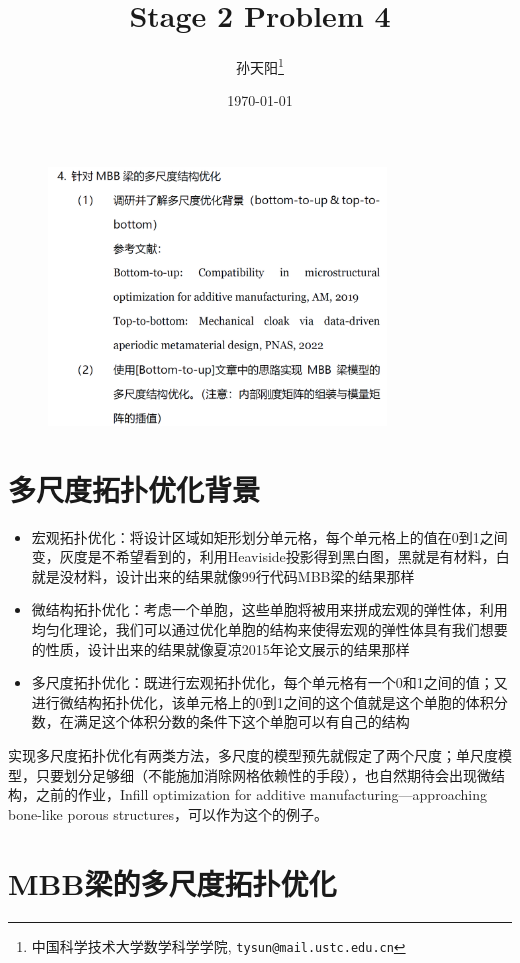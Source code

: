 \documentclass{article}
\title{Stage 2 Problem 4}
\author{孙天阳\thanks{中国科学技术大学数学科学学院, \texttt{tysun@mail.ustc.edu.cn}}}
\date{\today}
\begin{document}
\maketitle
\begin{figure}[h]
    \centering
    \includegraphics[width=0.8\textwidth]{Stage2_Problem4.png}
\end{figure}
\section{多尺度拓扑优化背景}
\begin{itemize}
\item 宏观拓扑优化：将设计区域如矩形划分单元格，每个单元格上的值在0到1之间变，灰度是不希望看到的，利用Heaviside投影得到黑白图，黑就是有材料，白就是没材料，设计出来的结果就像99行代码MBB梁的结果那样
\item 微结构拓扑优化：考虑一个单胞，这些单胞将被用来拼成宏观的弹性体，利用均匀化理论，我们可以通过优化单胞的结构来使得宏观的弹性体具有我们想要的性质，设计出来的结果就像夏凉2015年论文展示的结果那样
\item 多尺度拓扑优化：既进行宏观拓扑优化，每个单元格有一个0和1之间的值；又进行微结构拓扑优化，该单元格上的0到1之间的这个值就是这个单胞的体积分数，在满足这个体积分数的条件下这个单胞可以有自己的结构
\end{itemize}
实现多尺度拓扑优化有两类方法，多尺度的模型预先就假定了两个尺度；单尺度模型，只要划分足够细（不能施加消除网格依赖性的手段），也自然期待会出现微结构，之前的作业，Infill optimization for additive manufacturing—approaching bone-like porous structures，可以作为这个的例子。
\section{MBB梁的多尺度拓扑优化}
\end{document}
